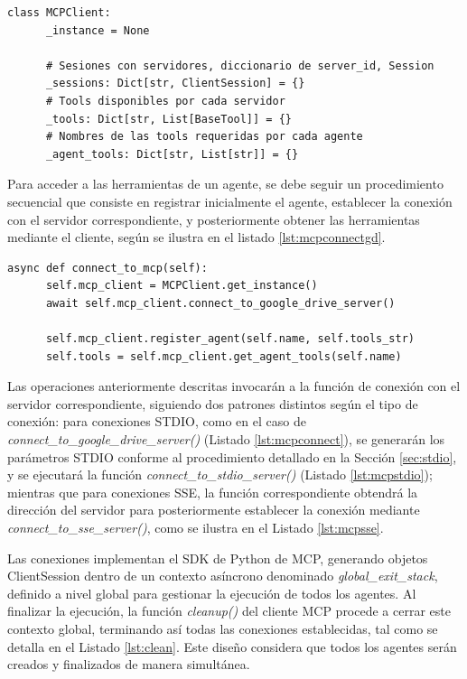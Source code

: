 
\begin{lstlisting}[caption={mcp\_multi\_client.py: clase Singleton MCPClient},label={lst:mcpclient}]
  class MCPClient:
      _instance = None

      # Sesiones con servidores, diccionario de server_id, Session
      _sessions: Dict[str, ClientSession] = {}
      # Tools disponibles por cada servidor
      _tools: Dict[str, List[BaseTool]] = {}
      # Nombres de las tools requeridas por cada agente
      _agent_tools: Dict[str, List[str]] = {}
\end{lstlisting}

Para acceder a las herramientas de un agente, se debe seguir un procedimiento secuencial que consiste en registrar inicialmente el agente, establecer la conexión con el servidor correspondiente, y posteriormente obtener las herramientas mediante el cliente, según se ilustra en el listado \ref{lst:mcpconnectgd}.

\begin{lstlisting}[caption={google\_drive\_agent\_graph.py: función \textit{connect\_to\_mcp en agente Google Drive}},label={lst:mcpconnectgd}]
  async def connect_to_mcp(self):
      self.mcp_client = MCPClient.get_instance()
      await self.mcp_client.connect_to_google_drive_server()

      self.mcp_client.register_agent(self.name, self.tools_str)
      self.tools = self.mcp_client.get_agent_tools(self.name)
\end{lstlisting}

Las operaciones anteriormente descritas invocarán a la función de conexión con el servidor correspondiente, siguiendo dos patrones distintos según el tipo de conexión: para conexiones STDIO, como en el caso de \textit{connect\_to\_google\_drive\_server()} (Listado \ref{lst:mcpconnect}), se generarán los parámetros STDIO conforme al procedimiento detallado en la Sección \ref{sec:stdio}, y se ejecutará la función \textit{connect\_to\_stdio\_server()} (Listado \ref{lst:mcpstdio}); mientras que para conexiones SSE, la función correspondiente obtendrá la dirección del servidor para posteriormente establecer la conexión mediante \textit{connect\_to\_sse\_server()}, como se ilustra en el Listado \ref{lst:mcpsse}.

Las conexiones implementan el SDK de Python de MCP, generando objetos ClientSession dentro de un contexto asíncrono denominado \textit{global\_exit\_stack}, definido a nivel global para gestionar la ejecución de todos los agentes. Al finalizar la ejecución, la función \textit{cleanup()} del cliente MCP procede a cerrar este contexto global, terminando así todas las conexiones establecidas, tal como se detalla en el Listado \ref{lst:clean}. Este diseño considera que todos los agentes serán creados y finalizados de manera simultánea.

